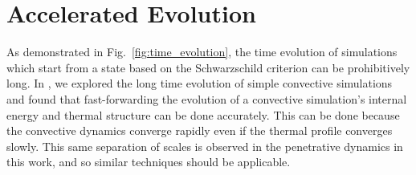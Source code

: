 \documentclass[twocolumn, linenumbers]{aastex631}
\begin{document}
\appendix

\section{Accelerated Evolution}
\label{app:accelerated_evolution}
As demonstrated in Fig.~\ref{fig:time_evolution}, the time evolution of simulations which start from a state based on the Schwarzschild criterion can be prohibitively long.
In \citet{anders_etal_2018}, we explored the long time evolution of simple convective simulations and found that fast-forwarding the evolution of a convective simulation's internal energy and thermal structure can be done accurately.
This can be done because the convective dynamics converge rapidly even if the thermal profile converges slowly.
This same separation of scales is observed in the penetrative dynamics in this work, and so similar techniques should be applicable.
\end{document}
